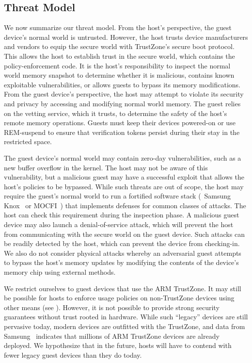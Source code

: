 \subsection{Threat Model} 
\label{section:threat}
%
We now summarize our threat model. From the host's perspective, the guest
device's normal world is untrusted. However, the host trusts device
manufacturers and vendors to equip the secure world with TrustZone's secure
boot protocol. This allows the host to establish trust in the secure world,
which contains the policy-enforcement code. It is the host's responsibility to
inspect the normal world memory snapshot to determine whether it is malicious,
contains known exploitable vulnerabilities, or allows guests to bypass its
memory modifications.  From the guest device's perspective, the host may
attempt to violate its security and privacy by accessing and modifying normal
world memory. The guest relies on the vetting service, which it trusts, to
determine the safety of the host's remote memory operations. Guests must keep
their devices powered-on or use REM-suspend to ensure that verification
tokens persist during their stay in the restricted space.

 The guest device's normal world may contain zero-day
vulnerabilities, such as a new buffer overflow in the kernel.  The host may not
be aware of this vulnerability, but a malicious guest may have a successful
exploit that allows the host's policies to be bypassed. While such threats are
out of scope,  the host may require the guest's normal world to run a fortified
software stack (\eg~Samsung Knox~\cite{knox:ccs14} or
MOCFI~\cite{mocfi:ndss12}) that implements defenses for common classes of
attacks.  The host can check this requirement during the inspection phase. A
malicious guest device may also launch a denial-of-service attack, which will
prevent the host from communicating with the secure world on the guest device.
Such attacks can be readily detected by the host, which can prevent the device
from checking-in. We also do not consider physical attacks whereby an
adversarial guest attempts to bypass the host's memory updates by modifying the
contents of the device's memory chip using external methods.

We restrict ourselves to guest devices that use the ARM TrustZone. It may still
be possible for hosts to enforce usage policies on non-TrustZone devices using
other means (see ). However, it is not possible to
provide strong security guarantees without trust rooted in hardware. While such
``legacy'' devices are still pervasive today, modern devices are outfitted with
the TrustZone, and data from Samsung~\cite{knox:ccs14} indicates that millions
of ARM TrustZone devices are already deployed. We hypothesize that in the
future, hosts will have to contend with fewer legacy guest devices than they do
today.

